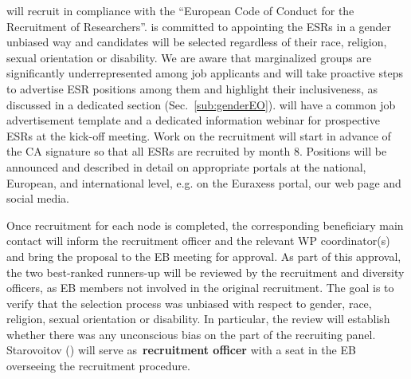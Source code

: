 
\acronym will recruit in compliance with the ``European Code of Conduct for the Recruitment of Researchers''. 
\acronym is committed to appointing the ESRs in a gender unbiased way and candidates will be selected regardless of their race, religion, sexual orientation or disability. 
We are aware that marginalized groups are significantly underrepresented among job applicants and will take proactive steps to advertise \acronym ESR positions among them and highlight their inclusiveness, as discussed in a dedicated section (Sec.~\ref{sub:genderEO}).
\acronym will have a common job advertisement template and a dedicated information webinar for prospective ESRs at the kick-off meeting. Work on the recruitment will start in advance of the CA signature so that all ESRs are recruited by month 8.
Positions will be announced and described in detail on appropriate portals at the national, European, and international level, e.g.
on the Euraxess portal, our web page and social media.

Once recruitment for each node is completed, the corresponding beneficiary main contact will inform the recruitment officer and the relevant WP coordinator(s) and bring the proposal to the EB meeting for approval. 
As part of this approval, the two best-ranked runners-up will be reviewed by the recruitment and diversity officers, as EB members not involved in the original recruitment. 
The goal is to verify that the selection process was unbiased with respect to gender, race, religion, sexual orientation or disability. 
In particular, the review will establish whether there was any unconscious bias on the part of the recruiting panel. 
Starovoitov (\heidelbergshort) will serve as~\textbf{recruitment officer} with a seat in the EB overseeing the recruitment procedure. 

